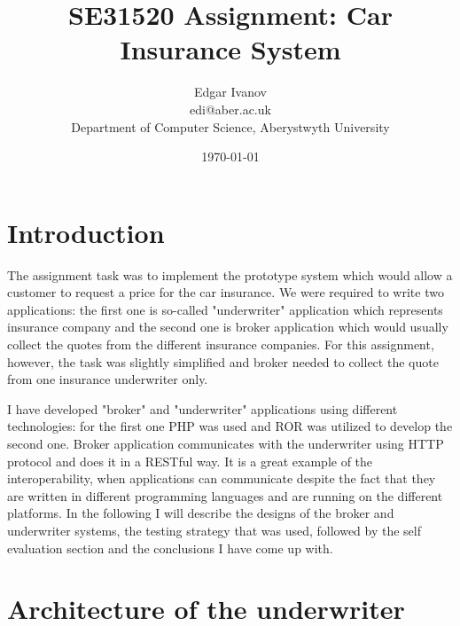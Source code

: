 \documentclass[10pt,a4paper,headinclude=true,twoside]{report}
\begin{document}
\title{SE31520 Assignment: Car Insurance System}
\author{Edgar Ivanov\\ edi@aber.ac.uk \\ Department of Computer Science, Aberystwyth University}
\date{\today}
\maketitle

\newpage
\thispagestyle{empty}
\mbox{}

\tableofcontents

\section{Introduction}
The assignment task was to implement the prototype system which would allow a customer to request a price for the car insurance. We were required to write two applications: the first one is so-called "underwriter" application which represents insurance company and the second one is broker application which would usually collect the quotes from the different insurance companies. For this assignment, however, the task was slightly simplified and broker needed to collect the quote from one insurance underwriter only.

I have developed "broker" and "underwriter" applications using different technologies: for the first one PHP was used and ROR was utilized to develop the second one. Broker application communicates with the underwriter using HTTP protocol and does it in a RESTful way. It is a great example of the interoperability, when applications can communicate despite the fact that they are written in different programming languages and are running on the different platforms. In the following I will describe the designs of the broker and underwriter systems, the testing strategy that was used, followed by the self evaluation section and the conclusions I have come up with. 

\section{Architecture of the underwriter}
\label{sec:Architectureoftheunderwriter}
\end{document}

